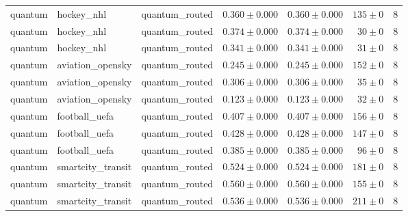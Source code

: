 \begin{table}[htbp]
\begin{tabular}{l l l r r r r}
quantum & hockey\_nhl & quantum\_routed & $0.360\pm0.000$ & $0.360\pm0.000$ & $135\pm0$ & 8 \\
quantum & hockey\_nhl & quantum\_routed & $0.374\pm0.000$ & $0.374\pm0.000$ & $30\pm0$ & 8 \\
quantum & hockey\_nhl & quantum\_routed & $0.341\pm0.000$ & $0.341\pm0.000$ & $31\pm0$ & 8 \\
quantum & aviation\_opensky & quantum\_routed & $0.245\pm0.000$ & $0.245\pm0.000$ & $152\pm0$ & 8 \\
quantum & aviation\_opensky & quantum\_routed & $0.306\pm0.000$ & $0.306\pm0.000$ & $35\pm0$ & 8 \\
quantum & aviation\_opensky & quantum\_routed & $0.123\pm0.000$ & $0.123\pm0.000$ & $32\pm0$ & 8 \\
quantum & football\_uefa & quantum\_routed & $0.407\pm0.000$ & $0.407\pm0.000$ & $156\pm0$ & 8 \\
quantum & football\_uefa & quantum\_routed & $0.428\pm0.000$ & $0.428\pm0.000$ & $147\pm0$ & 8 \\
quantum & football\_uefa & quantum\_routed & $0.385\pm0.000$ & $0.385\pm0.000$ & $96\pm0$ & 8 \\
quantum & smartcity\_transit & quantum\_routed & $0.524\pm0.000$ & $0.524\pm0.000$ & $181\pm0$ & 8 \\
quantum & smartcity\_transit & quantum\_routed & $0.560\pm0.000$ & $0.560\pm0.000$ & $155\pm0$ & 8 \\
quantum & smartcity\_transit & quantum\_routed & $0.536\pm0.000$ & $0.536\pm0.000$ & $211\pm0$ & 8 \\
\hline
\end{tabular}
\end{table}
